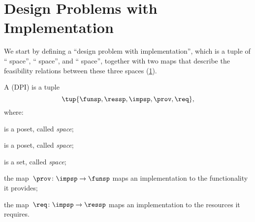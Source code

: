 

\section[DPIs]{Design Problems with Implementation}
\label{sec:Design-Problems}
We start by defining a ``design problem with implementation'', which is a tuple of `` space'',
`` space'', and `` space'', together with two maps that describe the feasibility relations between these three spaces (\cref{fig:setup}).

\begin{definition}
    \label{def:DPI}
    A \emph{} (DPI) is a tuple
    \begin{equation}
        \tup{\funsp, \ressp, \impsp, \prov,\req},
    \end{equation}
    where:
    
    \begin{compactitem}
        \item \funsp is a poset, called \emph{ space};
        \item \ressp is a poset, called \emph{ space};
        \item \impsp is a set, called \emph{ space};
        \item the map~$\prov\colon\impsp\to\funsp$
        maps an implementation to the functionality it provides;
        \item the map~$\req\colon\impsp\to\ressp$
        maps an implementation to the resources it requires.
    \end{compactitem}

\end{definition}

\begin{figure}[h]
    \centering
    \caption{}
    \label{fig:setup}
\end{figure}

